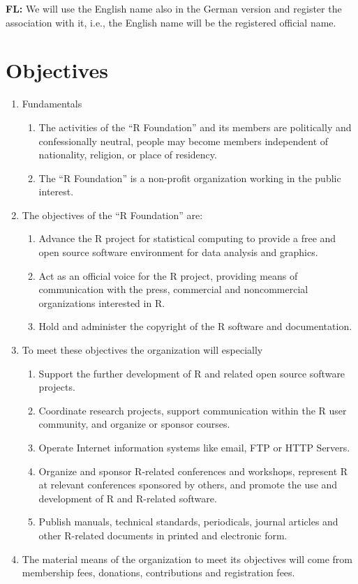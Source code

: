 \documentclass[a4paper]{article}
\newcommand{\note}[2]{{\it \par\noindent\textbf{#1:} #2}}
\begin{document}
\note{FL}{We will use the English name also in the German version and
  register the association with it, i.e., the English name will be the
  registered official name.}

\section{Objectives}

\begin{enumerate}
 \item Fundamentals
  \begin{enumerate}
   \item The activities of the ``R Foundation'' and its members are
    politically and confessionally neutral, people may become members
    independent of nationality, religion, or place of residency.
   \item The ``R Foundation'' is a non-profit organization working in
    the public interest.
  \end{enumerate}
 \item The objectives of the ``R Foundation'' are:
  \begin{enumerate}
   \item Advance the R project for statistical computing to provide a
    free and open source software environment for data analysis and
    graphics. 
   \item Act as an official voice for the R project, providing means of
    communication with the press, commercial and noncommercial
    organizations interested in R.
   \item Hold and administer the copyright of the R software and
    documentation.
  \end{enumerate}

 \item To meet these objectives the organization will especially
  \begin{enumerate}
   \item Support the further development of R and related open source
    software projects.
   \item Coordinate research projects, support communication within
    the R user community, and organize or sponsor courses.
   \item Operate Internet information systems like email, FTP or HTTP
    Servers.
   \item Organize and sponsor R-related conferences and workshops,
    represent R at relevant conferences sponsored by others, and
    promote the use and development of R and R-related software.
   \item Publish manuals, technical standards, periodicals, journal
    articles and other R-related documents in printed and electronic
    form.
  \end{enumerate}

 \item The material means of the organization to meet its objectives will
  come from membership fees, donations, contributions and registration
  fees. 
  
\end{enumerate}
\end{document}
